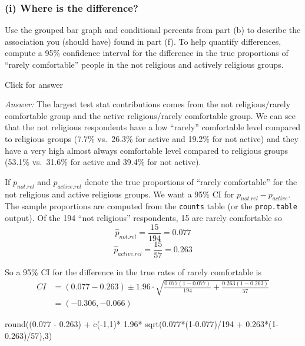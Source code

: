 \documentclass[
]{book}
\newenvironment{Shaded}{\begin{snugshade}}{\end{snugshade}}
\newcommand{\DecValTok}[1]{\textcolor[rgb]{0.00,0.00,0.81}{#1}}
\newcommand{\FloatTok}[1]{\textcolor[rgb]{0.00,0.00,0.81}{#1}}
\newcommand{\FunctionTok}[1]{\textcolor[rgb]{0.00,0.00,0.00}{#1}}
\newcommand{\NormalTok}[1]{#1}
\newcommand{\SpecialCharTok}[1]{\textcolor[rgb]{0.00,0.00,0.00}{#1}}
\begin{document}
\hypertarget{i-where-is-the-difference}{%
\subsubsection{(i) Where is the difference?}\label{i-where-is-the-difference}}

Use the grouped bar graph and conditional percents from part (b) to describe the association you (should have) found in part (f). To help quantify differences, compute a 95\% confidence interval for the difference in the true proportions of ``rarely comfortable'' people in the not religious and actively religious groups.

Click for answer

\emph{Answer:} The largest test stat contributions comes from the not religious/rarely comfortable group and the active religious/rarely comfortable group. We can see that the not religious respondents have a low ``rarely'' comfortable level compared to religious groups (7.7\% vs.~26.3\% for active and 19.2\% for not active) and they have a very high almost always comfortable level compared to religious groups (53.1\% vs.~31.6\% for active and 39.4\% for not active).

If \(p_{not.rel}\) and \(p_{active.rel}\) denote the true proportions of ``rarely comfortable'' for the not religious and active religious groups. We want a 95\% CI for \(p_{not.rel} - p_{active}\). The sample proportions are computed from the \texttt{counts} table (or the \texttt{prop.table} output). Of the 194 ``not religious'' respondents, 15 are rarely comfortable so
\[\hat{p}_{not.rel} = \frac{15}{194} = 0.077\]
\[\hat{p}_{active.rel} = \frac{15}{57} = 0.263\]

So a 95\% CI for the difference in the true rates of rarely comfortable is
\begin{align*}
CI &= (0.077 - 0.263) \pm 1.96\cdot\sqrt{\frac{0.077(1-0.077)}{194} + \frac{0.263(1-0.263)}{57}}\\
&= (-0.306, -0.066)
\end{align*}

\begin{Shaded}
\begin{Highlighting}[]
\FunctionTok{round}\NormalTok{((}\FloatTok{0.077} \SpecialCharTok{{-}} \FloatTok{0.263}\NormalTok{) }\SpecialCharTok{+} \FunctionTok{c}\NormalTok{(}\SpecialCharTok{{-}}\DecValTok{1}\NormalTok{,}\DecValTok{1}\NormalTok{)}\SpecialCharTok{*} \FloatTok{1.96}\SpecialCharTok{*} \FunctionTok{sqrt}\NormalTok{(}\FloatTok{0.077}\SpecialCharTok{*}\NormalTok{(}\DecValTok{1}\FloatTok{{-}0.077}\NormalTok{)}\SpecialCharTok{/}\DecValTok{194}  \SpecialCharTok{+} \FloatTok{0.263}\SpecialCharTok{*}\NormalTok{(}\DecValTok{1}\FloatTok{{-}0.263}\NormalTok{)}\SpecialCharTok{/}\DecValTok{57}\NormalTok{),}\DecValTok{3}\NormalTok{)}
\end{Highlighting}
\end{Shaded}
\end{document}
